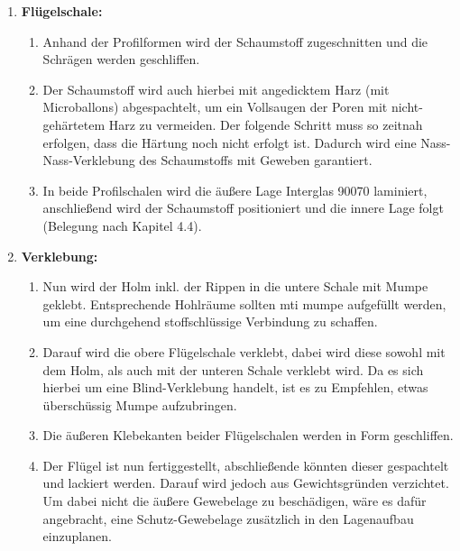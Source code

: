 \begin{enumerate}
\begin{enumerate}
	\end{enumerate}
	\item \textbf{Flügelschale:}
	\begin{enumerate}
		\item Anhand der Profilformen wird der Schaumstoff zugeschnitten und die Schrägen werden geschliffen.
		\item Der Schaumstoff wird auch hierbei mit angedicktem Harz (mit Microballons) \glqq abgespachtelt\grqq, um ein Vollsaugen der Poren mit nicht-gehärtetem Harz zu vermeiden. Der folgende Schritt muss so zeitnah erfolgen, dass die Härtung noch nicht erfolgt ist. Dadurch wird eine Nass-Nass-Verklebung des Schaumstoffs mit Geweben garantiert.
		\item In beide Profilschalen wird die äußere Lage Interglas 90070 laminiert, anschließend wird der Schaumstoff positioniert und die innere Lage folgt (Belegung nach Kapitel 4.4).
	\end{enumerate}
	\item \textbf{Verklebung:}
	\begin{enumerate}
		\item Nun wird der Holm inkl. der Rippen in die untere Schale mit Mumpe geklebt. Entsprechende Hohlräume sollten mti mumpe aufgefüllt werden, um eine durchgehend stoffschlüssige Verbindung zu schaffen.
		\item Darauf wird die obere Flügelschale verklebt, dabei wird diese sowohl mit dem Holm, als auch mit der unteren Schale verklebt wird. Da es sich hierbei um eine Blind-Verklebung handelt, ist es zu Empfehlen, etwas überschüssig Mumpe aufzubringen.
		\item Die äußeren Klebekanten beider Flügelschalen werden in Form geschliffen.
		\item Der Flügel ist nun fertiggestellt, abschließende könnten dieser gespachtelt und lackiert werden. Darauf wird jedoch aus Gewichtsgründen verzichtet. Um dabei nicht die äußere Gewebelage zu beschädigen, wäre es dafür angebracht, eine Schutz-Gewebelage zusätzlich in den Lagenaufbau einzuplanen.
	\end{enumerate}
\end{enumerate}


